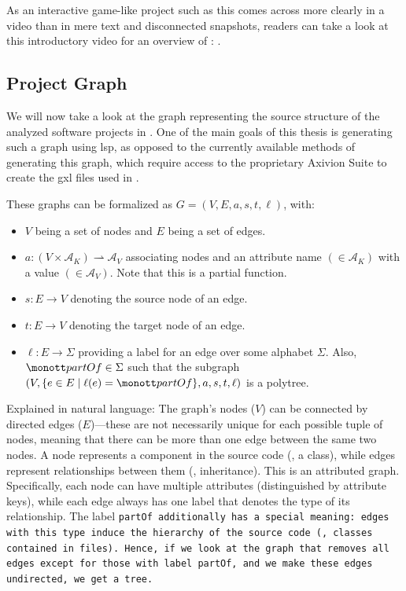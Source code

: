 \documentclass[../thesis]{subfiles}
\begin{document}
As an interactive game-like project such as this comes across more clearly in a video than in mere text and disconnected snapshots, readers can take a look at this introductory video for an overview of \SEE{}: .

\subsection{Project Graph}\label{subsec:graph}

We will now take a look at the graph representing the source structure of the analyzed software projects in \SEE{}.
One of the main goals of this thesis is generating such a graph using \gls{lsp}, as opposed to the currently available methods of generating this graph, which require access to the proprietary Axivion Suite to create the \gls{gxl} files used in \SEE{}.

These graphs can be formalized as $G = (V, E, a, s, t, \ell)$, with:
\begin{itemize}
	\item $V$ being a set of nodes and $E$ being a set of edges.
	\item $a: (V \times \mathcal{A}_K) \rightharpoonup \mathcal{A}_V$ associating nodes and an attribute name $(\in \mathcal{A}_{K})$ with a value $(\in \mathcal{A}_{V})$. Note that this is a partial function.
	\item $s: E \rightarrow V$ denoting the source node of an edge.
	\item $t: E \rightarrow V$ denoting the target node of an edge.
	\item $\ell: E \rightarrow \Sigma$ providing a label for an edge over some alphabet $\Sigma$.
	      Also, $\tt{partOf} \in \Sigma$ such that the subgraph $(V, \{e \in E \mid \ell(e) = \tt{partOf}\}, a, s, t, \ell)$ is a \gls{polytree}.
\end{itemize}

Explained in natural language:
The graph's nodes ($V$) can be connected by directed edges ($E$)---these are not necessarily unique for each possible tuple of nodes, meaning that there can be more than one edge between the same two nodes.
A node represents a component in the source code (\eg, a class), while edges represent relationships between them (\eg, inheritance).
This is an attributed graph.
Specifically, each node can have multiple attributes (distinguished by attribute keys), while each edge always has one label that denotes the type of its relationship.
The label \tt{partOf} additionally has a special meaning: edges with this type induce the hierarchy of the source code (\eg, classes contained in files).
Hence, if we look at the graph that removes all edges except for those with label \tt{partOf}, and we make these edges undirected, we get a tree.
\end{document}
